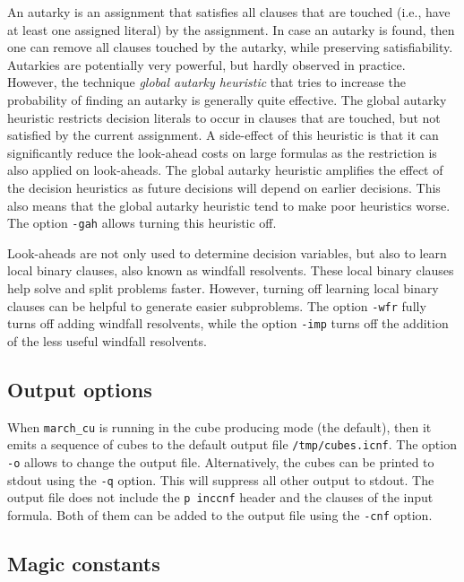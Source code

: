 \documentclass{llncs}
\begin{document}
An autarky is an assignment that satisfies all clauses that are touched (i.e., have at least one assigned literal) by the assignment.
In case an autarky is found, then one can remove all clauses touched by the autarky, while preserving satisfiability. Autarkies are
potentially very powerful, but hardly observed in practice. However, the technique {\em global autarky heuristic} that tries to increase
the probability of finding an autarky is generally quite effective. The global autarky heuristic restricts decision literals to occur in 
clauses that are touched, but not satisfied by the current assignment. A side-effect of this heuristic is that it can significantly reduce
the look-ahead costs on large formulas as the restriction is also applied on look-aheads. The global autarky heuristic amplifies the 
effect of the decision heuristics as future decisions will depend on earlier decisions. This also means that the global autarky heuristic
tend to make poor heuristics worse. The option {\tt -gah} allows turning this heuristic off. 

Look-aheads are not only used to determine decision variables, but also to learn local binary clauses, also known as windfall resolvents.
These local binary clauses help solve and split problems faster. However, turning off learning local binary clauses can be helpful to generate easier subproblems.
The option {\tt -wfr} fully turns off adding windfall resolvents, while the option {\tt -imp} turns off the addition of the less useful windfall resolvents.

\subsection{Output options}

When {\tt march\_cu} is running in the cube producing mode (the default), then it emits a sequence of cubes to the default 
output file {\tt /tmp/cubes.icnf}. The option {\tt -o} allows to change the output file. Alternatively, the cubes can be printed to
stdout using the {\tt -q} option. This will suppress all other output to stdout. The output file does not include the {\tt p inccnf}
header and the clauses of the input formula. Both of them can be added to the output file using the {\tt -cnf} option.

\subsection{Magic constants}
\label{sec:opt:magic}
\end{document}
